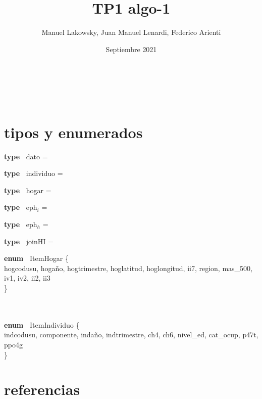 \documentclass{article}
\title{TP1 algo-1}
\author{Manuel Lakowsky, Juan Manuel Lenardi, Federico Arienti}
\date{Septiembre 2021}
\newcommand{\tab}[1][1cm]{\hspace*{#1}}
\newcommand{\type}[2]{%
    {\normalfont\bfseries\ttfamily\noindent type\ }%
    {\normalfont\ttfamily #1}
    {= #2\\}%
}
\newcommand{\enum}[2]{%
    {\normalfont\bfseries\ttfamily\noindent enum\ }%
    {\normalfont\ttfamily #1}
    {\{\\\tab#2\\\}}%
}
\begin{document}
    \begin{titlepage}
        \vspace*{\fill}
        \begin{center}
            {\Huge \@title}\\[0.5cm]
            {\Large \@author}\\[0.4cm]
            \@date
        \end{center}
        \vspace*{\fill}
    \end{titlepage}

    \section{tipos y enumerados}
    
        \type {dato}{\ent}
        \type {individuo}{} 
        \type {hogar}{\TLista{dato}}
        \type {eph$_i$}{}
        \type {eph$_h$}{}
        \type {joinHI}{}

        \enum {ItemHogar}{hogcodusu, hogaño, hogtrimestre, hoglatitud, hoglongitud, ii7, region, mas\_500, iv1, iv2, ii2, ii3} 
        \\\\
        \enum {ItemIndividuo}{indcodusu, componente, indaño, indtrimestre, ch4, ch6, nivel\_ed, cat\_ocup, p47t, ppo4g}

    \section{referencias}
        
\end{document}
